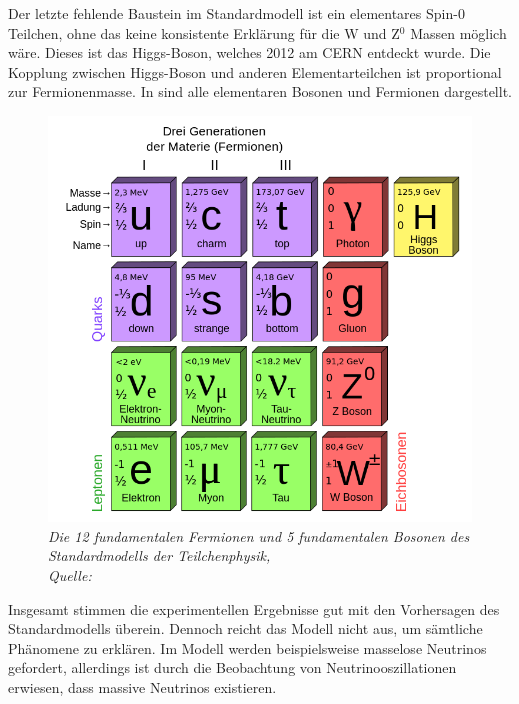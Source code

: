 Der letzte fehlende Baustein im Standardmodell ist ein elementares Spin-0 Teilchen, ohne das keine konsistente Erkl\"arung f\"ur die W und Z$^0$ Massen m\"oglich w\"are. Dieses ist das Higgs-Boson, welches 2012 am CERN entdeckt wurde. Die Kopplung zwischen Higgs-Boson und anderen Elementarteilchen ist proportional zur Fermionenmasse. In \cite{fig:Standardmodell} sind alle elementaren Bosonen und Fermionen dargestellt.

\begin{figure}[hhh]
 \begin{center}
   \includegraphics[width=\textwidth]{graphics/Standard_Model.png}
   \parbox[b]{12cm}{
     \caption[Standardmodell der Teilchenphysik]
             {\label{fig:Standardmodell} \it Die 12 fundamentalen Fermionen und 5 fundamentalen Bosonen des Standardmodells der Teilchenphysik,\\ Quelle: \cite{wiki:Standardmodell}}
   }
 \end{center}
\end{figure}

Insgesamt stimmen die experimentellen Ergebnisse gut mit den Vorhersagen des Standardmodells \"uberein. Dennoch reicht das Modell nicht aus, um s\"amtliche Ph\"anomene zu erkl\"aren. Im Modell werden beispielsweise masselose Neutrinos gefordert, allerdings ist durch die Beobachtung von Neutrinooszillationen erwiesen, dass massive Neutrinos existieren.

